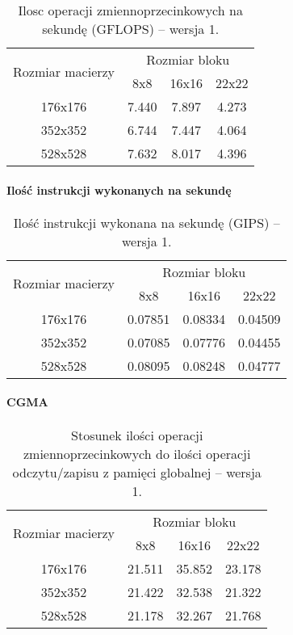 \begin{table}[H]
\centering
\begin{tabular}{|c|c|c|c|}
\hline
\multirow{2}{*}{Rozmiar macierzy} & \multicolumn{3}{c|}{Rozmiar bloku} \\ \cline{2-4}
& 8x8 & 16x16 & 22x22 \\ \hline
176x176 & 7.440 & 7.897 & 4.273 \\ \hline
352x352 & 6.744 & 7.447 & 4.064 \\ \hline
528x528 & 7.632 & 8.017 & 4.396 \\ \hline
\end{tabular}
\caption{Ilosc operacji zmiennoprzecinkowych na sekundę (GFLOPS) -- wersja 1.}
\end{table}

\paragraph{Ilość instrukcji wykonanych na sekundę}

\begin{table}[H]
\centering
\begin{tabular}{|c|c|c|c|}
\hline
\multirow{2}{*}{Rozmiar macierzy} & \multicolumn{3}{c|}{Rozmiar bloku} \\ \cline{2-4}
& 8x8 & 16x16 & 22x22 \\ \hline
176x176 & 0.07851 & 0.08334 & 0.04509 \\ \hline
352x352 & 0.07085 & 0.07776 & 0.04455 \\ \hline
528x528 & 0.08095 & 0.08248 & 0.04777 \\ \hline
\end{tabular}
\caption{Ilość instrukcji wykonana na sekundę (GIPS) -- wersja 1.}
\end{table}

\paragraph{CGMA}

\begin{table}[H]
\centering
\begin{tabular}{|c|c|c|c|}
\hline
\multirow{2}{*}{Rozmiar macierzy} & \multicolumn{3}{c|}{Rozmiar bloku} \\ \cline{2-4}
& 8x8 & 16x16 & 22x22 \\ \hline
176x176 & 21.511 & 35.852 & 23.178 \\ \hline
352x352 & 21.422 & 32.538 & 21.322 \\ \hline
528x528 & 21.178 & 32.267 & 21.768 \\ \hline
\end{tabular}
\caption{Stosunek ilości operacji zmiennoprzecinkowych do ilości operacji odczytu/zapisu z pamięci globalnej -- wersja 1.}
\end{table}

